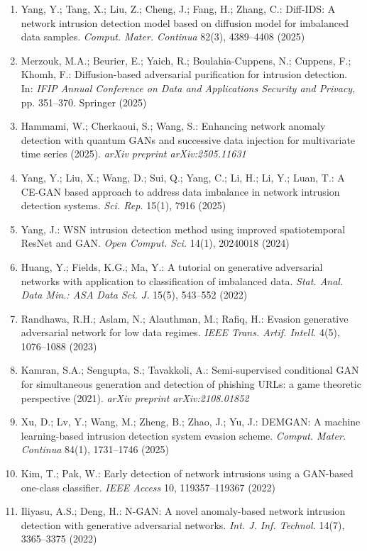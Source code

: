 \documentclass[a4paper]{article}
\begin{document}
\begin{enumerate}[leftmargin=1.2cm, itemsep=1pt, parsep=0pt]
    \item Yang, Y.; Tang, X.; Liu, Z.; Cheng, J.; Fang, H.; Zhang, C.: Diff-IDS: A network intrusion detection model based on diffusion model for imbalanced data samples. \textit{Comput. Mater. Continua} 82(3), 4389--4408 (2025)
    \item Merzouk, M.A.; Beurier, E.; Yaich, R.; Boulahia-Cuppens, N.; Cuppens, F.; Khomh, F.: Diffusion-based adversarial purification for intrusion detection. In: \textit{IFIP Annual Conference on Data and Applications Security and Privacy}, pp. 351--370. Springer (2025)
    \item Hammami, W.; Cherkaoui, S.; Wang, S.: Enhancing network anomaly detection with quantum GANs and successive data injection for multivariate time series (2025). \textit{arXiv preprint arXiv:2505.11631}
    \item Yang, Y.; Liu, X.; Wang, D.; Sui, Q.; Yang, C.; Li, H.; Li, Y.; Luan, T.: A CE-GAN based approach to address data imbalance in network intrusion detection systems. \textit{Sci. Rep.} 15(1), 7916 (2025)
    \item Yang, J.: WSN intrusion detection method using improved spatiotemporal ResNet and GAN. \textit{Open Comput. Sci.} 14(1), 20240018 (2024)
    \item Huang, Y.; Fields, K.G.; Ma, Y.: A tutorial on generative adversarial networks with application to classification of imbalanced data. \textit{Stat. Anal. Data Min.: ASA Data Sci. J.} 15(5), 543--552 (2022)
    \item Randhawa, R.H.; Aslam, N.; Alauthman, M.; Rafiq, H.: Evasion generative adversarial network for low data regimes. \textit{IEEE Trans. Artif. Intell.} 4(5), 1076--1088 (2023)
    \item Kamran, S.A.; Sengupta, S.; Tavakkoli, A.: Semi-supervised conditional GAN for simultaneous generation and detection of phishing URLs: a game theoretic perspective (2021). \textit{arXiv preprint arXiv:2108.01852}
    \item Xu, D.; Lv, Y.; Wang, M.; Zheng, B.; Zhao, J.; Yu, J.: DEMGAN: A machine learning-based intrusion detection system evasion scheme. \textit{Comput. Mater. Continua} 84(1), 1731--1746 (2025)
    \item Kim, T.; Pak, W.: Early detection of network intrusions using a GAN-based one-class classifier. \textit{IEEE Access} 10, 119357--119367 (2022)
    \item Iliyasu, A.S.; Deng, H.: N-GAN: A novel anomaly-based network intrusion detection with generative adversarial networks. \textit{Int. J. Inf. Technol.} 14(7), 3365--3375 (2022)

\end{enumerate}
\end{document}
